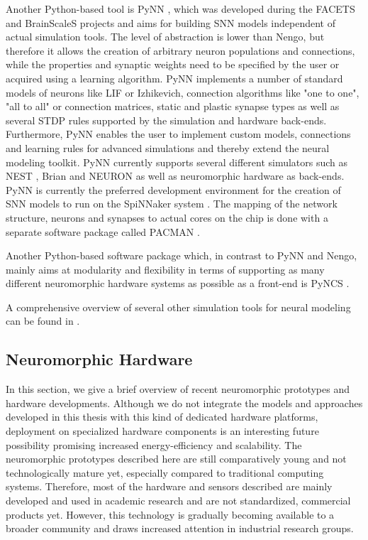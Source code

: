 Another Python-based tool is \ac{PyNN} \parencite{Davies2010}, which was developed during the \ac{FACETS}  and \ac{BrainScaleS}  projects and aims for building \ac{SNN} models independent of actual simulation tools.
The level of abstraction is lower than \ac{Nengo}, but therefore it allows the creation of arbitrary neuron populations and connections, while the properties and synaptic weights need to be specified by the user or acquired using a learning algorithm.
\ac{PyNN} implements a number of standard models of neurons like \ac{LIF} or Izhikevich, connection algorithms like "one to one", "all to all" or connection matrices, static and plastic synapse types as well as several \ac{STDP} rules supported by the simulation and hardware back-ends.
Furthermore, \ac{PyNN} enables the user to implement custom models, connections and learning rules for advanced simulations and thereby extend the neural modeling toolkit.
\ac{PyNN} currently supports several different simulators such as \ac{NEST} \parencite{Gewaltig2007}, Brian \parencite{Goodman2009} and NEURON  \parencite{Carnevale2009} as well as neuromorphic hardware as back-ends.
\ac{PyNN} is currently the preferred development environment for the creation of \ac{SNN} models to run on the \ac{SpiNNaker} system \parencite{Furber2014}.
The mapping of the network structure, neurons and synapses to actual cores on the chip is done with a separate software package called \ac{PACMAN} \parencite{Galluppi2012}.

Another Python-based software package which, in contrast to \ac{PyNN} and \ac{Nengo}, mainly aims at modularity and flexibility in terms of supporting as many different neuromorphic hardware systems as possible as a front-end is \ac{PyNCS} \parencite{Stefanini2014}.

A comprehensive overview of several other simulation tools for neural modeling can be found in \textcite{Brette2007}.

\subsection{Neuromorphic Hardware}
\label{sec:neuromorphic_HW}

In this section, we give a brief overview of recent neuromorphic prototypes and hardware developments.
Although we do not integrate the models and approaches developed in this thesis with this kind of dedicated hardware platforms, deployment on specialized hardware components is an interesting future possibility promising increased energy-efficiency and scalability.
The neuromorphic prototypes described here are still comparatively young and not technologically mature yet, especially compared to traditional computing systems.
Therefore, most of the hardware and sensors described are mainly developed and used in academic research and are not standardized, commercial products yet.
However, this technology is gradually becoming available to a broader community and draws increased attention in industrial research groups.

